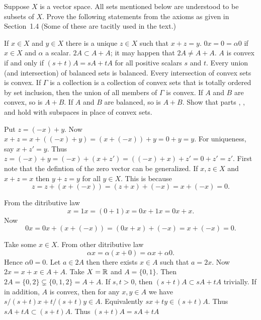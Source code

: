 \begin{enumerate}

\begin{excopy}
Suppose $X$ is a vector space. All sets mentioned below are understood
to be subsets of $X$.
Prove the following statements from the axioms as given in Section~1.4
(Some of these are tacitly used in the text.)
\begin{itemize}
   If \(x\in X\) and \(y\in X\) there is a unique \(z\in X\)
   such that \(x+z=y\).
  \(0x = 0 = \alpha 0\) if \(x\in X\) and \(\alpha\) a scalar.
  \(2A \subset A + A\); it may happen that \(2A \neq A + A\).
   $A$ is convex if and only if \((s+t)A = sA + tA\) for all positive
   scalars $s$ and $t$.
  Every union (and intersection) of balanced sets is balanced.
  Every intersection of convex sets is convex.
   If \(\Gamma\) is a collection is a collection 
   of convex sets that is totally ordered
   by set inclusion, then the union of all members of \(\Gamma\) is convex.
  If $A$ and $B$ are convex, so is \(A+B\).
  If $A$ and $B$ are balanced, so is \(A+B\).
   Show that parts , , and  hold
   with subspaces in place of convex sets.
\end{itemize}
\end{excopy}

\begin{itemize}
   Put \(z = (-x) + y\). Now 
   \(x+z = x + ((-x) + y) = (x + (-x)) + y = 0 + y = y\).
   For uniqueness, say \(x+z' = y\). Thus
   \(z = (-x) + y = (-x) + (x+z') = ((-x) + x) + z' = 0 + z' = z'\).
   First note that the defintion of the zero vector
   can be generalized. If  \(x,z\in X\) and \(x+z = x\) then
   \(y+z = y\) for all \(y\in X\).
   This is because
  \[z = z+(x+(-x)) = (z+x)+(-x) = x+(-x) = 0.\]

   From the ditributive law \[x = 1x = (0 + 1)x = 0x + 1x = 0x + x.\]
   Now \[0x = 0x + (x + (-x)) = (0x + x) + (-x) = x + (-x) = 0.\]

   Take some \(x\in X\). From other ditributive law
   \[\alpha x = \alpha (x+0) = \alpha x + \alpha 0.\]
   Hence \(\alpha 0 = 0\).
   Let \(a\in 2A\) then there exists \(x\in A\) such that \(a=2x\).
   Now \(2x = x + x \in A + A\).
   Take \(X=\mathbb{R}\) and \(A = \{0,1\}\).
   Then \(2A = \{0,2\} \subsetneq \{0,1,2\} = A+A\).
   If \(s,t > 0\), then \((s+t)A \subset sA + tA\) trivially.
   If in addition, $A$ is convex, then   
   for any \(x,y\in A\) we have \(s/(s+t)x + t/(s+t)y \in A\).
   Equivalently \(sx + ty \in (s+t)A\). Thus
   \(sA + tA \subset (s+t)A\). Thus \((s+t)A = sA + tA\)


\end{itemize}
\end{enumerate}
